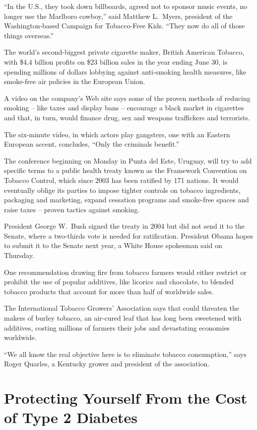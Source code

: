 ﻿\documentclass[12pt]{article}
\begin{document}
``In the U.S., they took down billboards, agreed not to sponsor music events, no longer use the
Marlboro cowboy,'' said Matthew L.~Myers, president of the Washington-based Campaign for
Tobacco-Free Kids. ``They now do all of those things overseas.''

The world's second-biggest private cigarette maker, British American Tobacco, with \$4.4 billion
profits on \$23 billion sales in the year ending June 30, is spending millions of dollars lobbying
against anti-smoking health measures, like smoke-free air policies in the European Union.

A video on the company's Web site says some of the proven methods of reducing smoking -- like taxes
and display bans -- encourage a black market in cigarettes and that, in turn, would finance drug,
sex and weapons traffickers and terrorists.

The six-minute video, in which actors play gangsters, one with an Eastern European accent,
concludes, ``Only the criminals benefit.''

The conference beginning on Monday in Punta del Este, Uruguay, will try to add specific terms to a
public health treaty known as the Framework Convention on Tobacco Control, which since 2003 has been
ratified by 171 nations. It would eventually oblige its parties to impose tighter controls on
tobacco ingredients, packaging and marketing, expand cessation programs and smoke-free spaces and
raise taxes -- proven tactics against smoking.

President George W.~Bush signed the treaty in 2004 but did not send it to the Senate, where a
two-thirds vote is needed for ratification. President Obama hopes to submit it to the Senate next
year, a White House spokesman said on Thursday.

One recommendation drawing fire from tobacco farmers would either restrict or prohibit the use of
popular additives, like licorice and chocolate, to blended tobacco products that account for more
than half of worldwide sales.

The International Tobacco Growers' Association says that could threaten the makers of burley
tobacco, an air-cured leaf that has long been sweetened with additives, costing millions of farmers
their jobs and devastating economies worldwide.

``We all know the real objective here is to eliminate tobacco consumption,'' says Roger Quarles, a
Kentucky grower and president of the association.

\section{Protecting Yourself From the Cost of Type 2 Diabetes}
\end{document}
